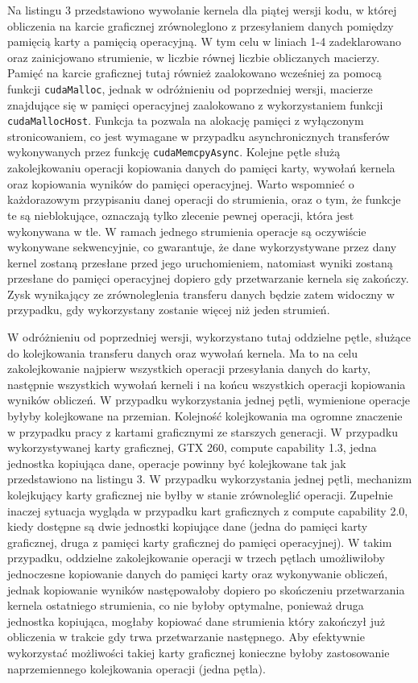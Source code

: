 \documentclass[12pt,a4paper]{article}
\begin{document}
Na listingu 3 przedstawiono wywołanie kernela dla piątej wersji kodu, w której obliczenia na karcie graficznej zrównoleglono z przesyłaniem danych pomiędzy pamięcią karty a pamięcią operacyjną. W tym celu w liniach 1-4 zadeklarowano oraz zainicjowano strumienie, w liczbie równej liczbie obliczanych macierzy. Pamięć na karcie graficznej tutaj również zaalokowano wcześniej za pomocą funkcji \verb|cudaMalloc|, jednak w odróżnieniu od poprzedniej wersji, macierze znajdujące się w pamięci operacyjnej zaalokowano z wykorzystaniem funkcji \verb|cudaMallocHost|. Funkcja ta pozwala na alokację pamięci z wyłączonym stronicowaniem, co jest wymagane w przypadku asynchronicznych transferów wykonywanych przez funkcję \verb|cudaMemcpyAsync|. Kolejne pętle służą zakolejkowaniu operacji kopiowania danych do pamięci karty, wywołań kernela oraz kopiowania wyników do pamięci operacyjnej. Warto wspomnieć o każdorazowym przypisaniu danej operacji do strumienia, oraz o tym, że funkcje te są nieblokujące, oznaczają tylko zlecenie pewnej operacji, która jest wykonywana w tle. W ramach jednego strumienia operacje są oczywiście wykonywane sekwencyjnie, co gwarantuje, że dane wykorzystywane przez dany kernel zostaną przesłane przed jego uruchomieniem, natomiast wyniki zostaną przesłane do pamięci operacyjnej dopiero gdy przetwarzanie kernela się zakończy. Zysk wynikający ze zrównoleglenia transferu danych będzie zatem widoczny w przypadku, gdy wykorzystany zostanie więcej niż jeden strumień.

W odróżnieniu od poprzedniej wersji, wykorzystano tutaj oddzielne pętle, służące do kolejkowania transferu danych oraz wywołań kernela. Ma to na celu zakolejkowanie najpierw wszystkich operacji przesyłania danych do karty, następnie wszystkich wywołań kerneli i na końcu wszystkich operacji kopiowania wyników obliczeń. W przypadku wykorzystania jednej pętli, wymienione operacje byłyby kolejkowane na przemian. Kolejność kolejkowania ma ogromne znaczenie w przypadku pracy z kartami graficznymi ze starszych generacji. W przypadku wykorzystywanej karty graficznej, GTX 260, compute capability 1.3, jedna jednostka kopiująca dane, operacje powinny być kolejkowane tak jak przedstawiono na listingu 3. W przypadku wykorzystania jednej pętli, mechanizm kolejkujący karty graficznej nie byłby w stanie zrównoleglić operacji. Zupełnie inaczej sytuacja wygląda w przypadku kart graficznych z compute capability 2.0, kiedy dostępne są dwie jednostki kopiujące dane (jedna do pamięci karty graficznej, druga z pamięci karty graficznej do pamięci operacyjnej). W takim przypadku, oddzielne zakolejkowanie operacji w trzech pętlach umożliwiłoby jednoczesne kopiowanie danych do pamięci karty oraz wykonywanie obliczeń, jednak kopiowanie wyników następowałoby dopiero po skończeniu przetwarzania kernela ostatniego strumienia, co nie byłoby optymalne, ponieważ druga jednostka kopiująca, mogłaby kopiować dane strumienia który zakończył już obliczenia w trakcie gdy trwa przetwarzanie następnego. Aby efektywnie wykorzystać możliwości takiej karty graficznej konieczne byłoby zastosowanie naprzemiennego kolejkowania operacji (jedna pętla).
\end{document}
